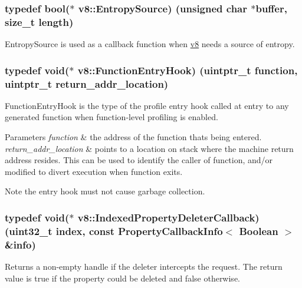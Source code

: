\subsubsection[{Entropy\+Source}]{\setlength{\rightskip}{0pt plus 5cm}typedef bool($\ast$ v8\+::\+Entropy\+Source) (unsigned char $\ast$buffer, size\+\_\+t length)}\label{namespacev8_ab699f4bbbb56350e6e915682e420fcdc}
Entropy\+Source is used as a callback function when \hyperlink{namespacev8}{v8} needs a source of entropy. \hypertarget{namespacev8_aaf07fb6bb13f295da3c6568938b7dec5}{}
\subsubsection[{Function\+Entry\+Hook}]{\setlength{\rightskip}{0pt plus 5cm}typedef void($\ast$ v8\+::\+Function\+Entry\+Hook) (uintptr\+\_\+t function, uintptr\+\_\+t return\+\_\+addr\+\_\+location)}\label{namespacev8_aaf07fb6bb13f295da3c6568938b7dec5}
Function\+Entry\+Hook is the type of the profile entry hook called at entry to any generated function when function-\/level profiling is enabled.


\begin{DoxyParams}{Parameters}
{\em function} & the address of the function that\textquotesingle{}s being entered. \\
\hline
{\em return\+\_\+addr\+\_\+location} & points to a location on stack where the machine return address resides. This can be used to identify the caller of {\ttfamily function}, and/or modified to divert execution when {\ttfamily function} exits.\\
\hline
\end{DoxyParams}
\begin{DoxyNote}{Note}
the entry hook must not cause garbage collection. 
\end{DoxyNote}
\hypertarget{namespacev8_a53863728de14cde48dd6543207b2f2da}{}
\subsubsection[{Indexed\+Property\+Deleter\+Callback}]{\setlength{\rightskip}{0pt plus 5cm}typedef void($\ast$ v8\+::\+Indexed\+Property\+Deleter\+Callback) (uint32\+\_\+t index, const {\bf Property\+Callback\+Info}$<$ {\bf Boolean} $>$ \&info)}\label{namespacev8_a53863728de14cde48dd6543207b2f2da}
Returns a non-\/empty handle if the deleter intercepts the request. The return value is true if the property could be deleted and false otherwise. \hypertarget{namespacev8_adbb0a6d5537371953f9ba807d4f6275e}{}
